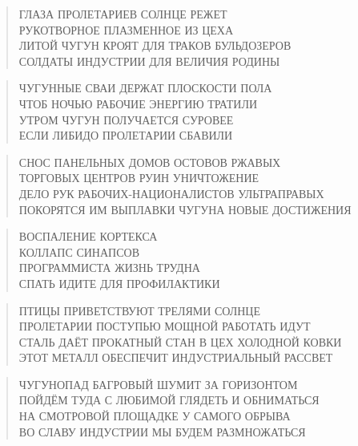 \poemtitle{***}
\begin{verse}
ГЛАЗА ПРОЛЕТАРИЕВ СОЛНЦЕ РЕЖЕТ\\
РУКОТВОРНОЕ ПЛАЗМЕННОЕ ИЗ ЦЕХА\\
ЛИТОЙ ЧУГУН КРОЯТ ДЛЯ ТРАКОВ БУЛЬДОЗЕРОВ\\
СОЛДАТЫ ИНДУСТРИИ ДЛЯ ВЕЛИЧИЯ РОДИНЫ
\end{verse}

\poemtitle{***}
\begin{verse}
ЧУГУННЫЕ СВАИ ДЕРЖАТ ПЛОСКОСТИ ПОЛА\\
ЧТОБ НОЧЬЮ РАБОЧИЕ ЭНЕРГИЮ ТРАТИЛИ\\
УТРОМ ЧУГУН ПОЛУЧАЕТСЯ СУРОВЕЕ\\
ЕСЛИ ЛИБИДО ПРОЛЕТАРИИ СБАВИЛИ
\end{verse}

\poemtitle{***}
\begin{verse}
СНОС ПАНЕЛЬНЫХ ДОМОВ ОСТОВОВ РЖАВЫХ\\
ТОРГОВЫХ ЦЕНТРОВ РУИН УНИЧТОЖЕНИЕ\\
ДЕЛО РУК РАБОЧИХ-НАЦИОНАЛИСТОВ УЛЬТРАПРАВЫХ\\
ПОКОРЯТСЯ ИМ ВЫПЛАВКИ ЧУГУНА НОВЫЕ ДОСТИЖЕНИЯ
\end{verse}

\poemtitle{***}
\begin{verse}
ВОСПАЛЕНИЕ КОРТЕКСА\\
КОЛЛАПС СИНАПСОВ\\
ПРОГРАММИСТА ЖИЗНЬ ТРУДНА\\
СПАТЬ ИДИТЕ ДЛЯ ПРОФИЛАКТИКИ
\end{verse}

\poemtitle{***}
\begin{verse}
ПТИЦЫ ПРИВЕТСТВУЮТ ТРЕЛЯМИ СОЛНЦЕ\\
ПРОЛЕТАРИИ ПОСТУПЬЮ МОЩНОЙ РАБОТАТЬ ИДУТ\\
СТАЛЬ ДАЁТ ПРОКАТНЫЙ СТАН В ЦЕХ ХОЛОДНОЙ КОВКИ\\
ЭТОТ МЕТАЛЛ ОБЕСПЕЧИТ ИНДУСТРИАЛЬНЫЙ РАССВЕТ
\end{verse}

\poemtitle{***}
\begin{verse}
ЧУГУНОПАД БАГРОВЫЙ ШУМИТ ЗА ГОРИЗОНТОМ\\
ПОЙДЁМ ТУДА С ЛЮБИМОЙ ГЛЯДЕТЬ И ОБНИМАТЬСЯ\\
НА СМОТРОВОЙ ПЛОЩАДКЕ У САМОГО ОБРЫВА\\
ВО СЛАВУ ИНДУСТРИИ МЫ БУДЕМ РАЗМНОЖАТЬСЯ
\end{verse}

